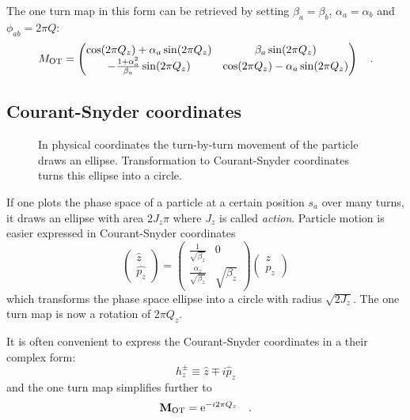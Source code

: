 The one turn map in this form can be retrieved by setting $\beta_a = \beta_b $, $\alpha_a = \alpha_b$
and $\phi_{ab} = 2\pi Q$:
%
\begin{equation}
    M_\text{OT} = \begin{pmatrix}
        \cos(2\pi Q_z) + \alpha_a \sin(2\pi Q_z) & \beta_a\sin(2\pi Q_z) \\
        -\frac{1+\alpha_a^2}{\beta_a}\sin(2\pi Q_z) & \cos(2\pi Q_z) - \alpha_a\sin(2\pi Q_z)
    \end{pmatrix}
    \quad .
\end{equation}
%
\subsection{Courant-Snyder coordinates}
%
\begin{figure}[h]
    \centering
    
    \hspace{1em}
    
    \caption{In physical coordinates the turn-by-turn movement of the particle draws an ellipse.
        Transformation to Courant-Snyder
        coordinates turns this ellipse into a circle.}
    \label{fig_phase_space_ellipse}
\end{figure}
%
If one plots the phase space of a particle at a certain position $s_a$ over many turns, it draws an
ellipse with area $2J_z\pi$ where $J_z$ is called \emph{action}.
Particle motion is easier expressed in Courant-Snyder coordinates
%
\begin{equation}
    \begin{pmatrix}
        \hat{z}\\
        \hat{p_z}
    \end{pmatrix}
    =
    \begin{pmatrix}
        \frac{1}{\sqrt{\beta_z}} & 0\\
        \frac{\alpha_z}{\sqrt{\beta_z}} & \sqrt{\beta_z}
    \end{pmatrix}
    \begin{pmatrix}
        z\\
        p_z
    \end{pmatrix}
    \label{eq_cs_matrix}
\end{equation}
%
which transforms the phase space ellipse into a circle with radius $\sqrt{2J_z}$.
The one turn map is now a rotation of $2\pi Q_z$. 

It is often convenient to express the Courant-Snyder coordinates in a their complex form:
%
\begin{equation}
    h^\pm_z \equiv \hat{z} \mp i \hat{p}_z
    \label{eq_courantsnyder}
\end{equation}
%
and the one turn map simplifies further to
%
\begin{equation}
    \mathbf{M}_\text{OT} = \text{e}^{-i2\pi Q_z}
    \quad .
\end{equation}

